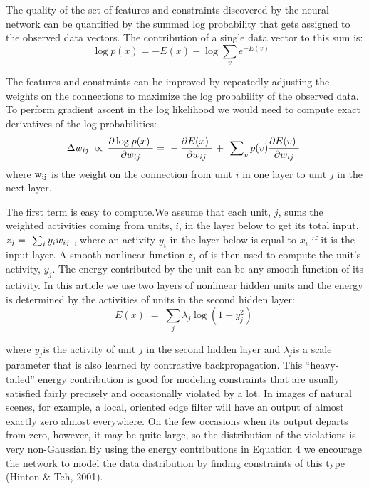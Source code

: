 \par{The quality of the set of features and constraints discovered by the neural network can be quantified by the summed log probability that gets assigned to the observed data vectors. The contribution of a single data vector to this sum is:
\begin{equation}\label{equation2}\log p(x) =  - E(x) - \log \sum\limits_v {{e^{ - E(v)}}} \;\;\;\end{equation}
}
\par{The features and constraints can be improved by repeatedly adjusting the weights on the connections to maximize the log probability of the observed data. To perform gradient ascent in the log likelihood we would need to compute exact derivatives of the log probabilities:
 \begin{equation}\label{equation3}\Delta {w_{ij}}{\kern 1pt} {\kern 1pt} {\kern 1pt}  \propto {\kern 1pt} {\kern 1pt} \frac{{\partial \log {\kern 1pt} p(x){\kern 1pt} {\kern 1pt} {\kern 1pt} }}{{\partial {w_{ij}}}} = {\kern 1pt}  - \frac{{\partial E(x){\kern 1pt} {\kern 1pt} {\kern 1pt} }}{{\partial {w_{ij}}}}{\kern 1pt}  + {\kern 1pt} {\kern 1pt} \sum\nolimits_v {p(v)\frac{{\partial E(v){\kern 1pt} {\kern 1pt} {\kern 1pt} }}{{\partial {w_{ij}}}}} \;\end{equation}
where ${{\rm{w}}_{{\rm{ij}}}}$ is the weight on the connection from unit $i$ in one layer to unit $j$ in the next layer.
}
\par{The first term is easy to compute.We assume that each unit, $j$, sums the weighted activities coming from units, $i$, in the layer below to get its total input,${z_j} = {\kern 1pt} {\kern 1pt} \sum\nolimits_i {{y_i}{w_{ij}}} $  , where an activity ${y_i}$ in the layer below is equal to  ${x_i}$ if it is the input layer. A smooth nonlinear function ${z_j}$ of  is then used to compute the unit’s activity, ${y_j}$. The energy contributed by the unit can be any smooth function of its activity. In this article we use two layers of nonlinear hidden units and the energy is determined by the activities of units in the second hidden layer:
\begin{equation}\label{equation4}E(x)\; = \;\sum\limits_j {{\lambda _j}\log (1 + y_j^2)} \;\end{equation}

}
\par{where  ${y_j}$is the activity of unit $j$ in the second hidden layer and   ${\lambda _j}$is a scale parameter that is also learned by contrastive backpropagation. This “heavy-tailed” energy contribution is good for modeling constraints that are usually satisfied fairly precisely and occasionally violated by a lot. In images of natural scenes, for example, a local, oriented edge filter will have an output of almost exactly zero almost everywhere. On the few occasions when its output departs from zero, however, it may be quite large, so the distribution of the violations is very non-Gaussian.By using the energy contributions in Equation 4 we encourage the network to model the data distribution by finding constraints of this type (Hinton \& Teh, 2001).
}
